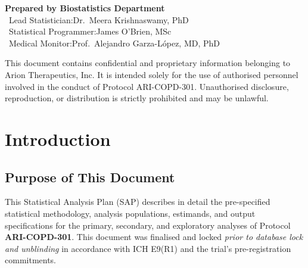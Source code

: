 \documentclass[11pt,a4paper]{article}
\begin{document}
\vspace{12mm}

\begin{center}
{\color{sapsteel}\bfseries\small Prepared by Biostatistics Department}\\[4pt]
{\small\color{sapgrey}
\ Lead Statistician:\quad Dr.\ Meera Krishnaswamy, PhD\\[2pt]
\ Statistical Programmer:\quad James O'Brien, MSc\\[2pt]
\ Medical Monitor:\quad Prof.\ Alejandro Garza-López, MD, PhD
}
\end{center}

\vspace{14mm}

\begin{tcolorbox}[sapwarn, title={\faIcon{lock}\ CONFIDENTIALITY NOTICE}]
  This document contains confidential and proprietary information belonging to
  Arion Therapeutics, Inc. It is intended solely for the use of authorised personnel
  involved in the conduct of Protocol ARI-COPD-301. Unauthorised disclosure,
  reproduction, or distribution is strictly prohibited and may be unlawful.
\end{tcolorbox}

\clearpage
\nopagecolor
\setcounter{page}{1}

\tableofcontents
\clearpage

\section{Introduction}

\subsection{Purpose of This Document}

This Statistical Analysis Plan (SAP) describes in detail the pre-specified statistical
methodology, analysis populations, estimands, and output specifications for the
primary, secondary, and exploratory analyses of Protocol \textbf{ARI-COPD-301}.
This document was finalised and locked \textit{prior to database lock and unblinding}
in accordance with ICH E9(R1) and the trial's pre-registration commitments.
\end{document}
